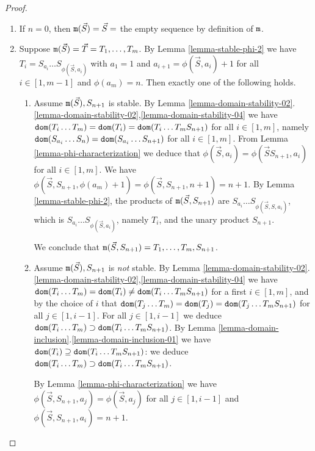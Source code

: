 \documentclass{lmcs}
\begin{document}
\begin{proof}
\begin{enumerate}
\item
If $n=0$, then ${\tt m}(\vec{S}) = \vec{S} = $ the empty sequence by definition
of ${\tt m}$.

\item
Suppose ${\tt m}(\vec{S}) = \vec{T} = T_1, \ldots, T_m$.  
By Lemma \ref{lemma-stable-phi-2}
we have $T_i = S_{a_i} \ldots S_{\phi(\vec{S},a_i)}$ with 
$a_1=1$ and $a_{i+1} = \phi(\vec{S},a_i)+1$ 
for all $i \in [1,m-1]$ and $\phi(a_{m}) = n$.  Then exactly one of the following holds.

\begin{enumerate}

\item
Assume ${\tt m}(\vec{S}), S_{n+1}$ is stable. By 
Lemma \ref{lemma-domain-stability-02}.
\ref{lemma-domain-stability-02},\ref{lemma-domain-stability-04} 
we have
${\tt dom}(T_i \ldots T_m) = {\tt dom}(T_i ) = {\tt dom}(T_i \ldots T_m S_{n+1})$ for all $i \in [1,m]$,
namely ${\tt dom}(S_{a_i} \ldots S_n) = {\tt dom}(S_{a_i} \ldots  S_{n+1})$ for all $i \in [1,m]$.
From Lemma \ref{lemma-phi-characterization} we deduce that $\phi(\vec{S},a_i) = 
\phi(\vec{S}S_{n+1},a_i)$ for all $i \in [1,m]$. We have 
$\phi(\vec{S},S_{n+1},\phi(a_{m}) +1)
= \phi(\vec{S},S_{n+1},n+1)=n+1$. By Lemma \ref{lemma-stable-phi-2}, the products of
${\tt m}(\vec{S},S_{n+1})$ are $S_{a_i} \ldots S_{\phi(\vec{S},S,a_i)}$, which is
$S_{a_i} \ldots S_{\phi(\vec{S},a_i)}$, namely $T_i$, and the unary product $S_{n+1}$.

We conclude that ${\tt m}(\vec{S}, S_{n+1}) = T_1, \ldots, T_m, S_{n+1}$.

\item
Assume ${\tt m}(\vec{S}), S_{n+1}$ is \emph{not} stable. By 
Lemma \ref{lemma-domain-stability-02}.
\ref{lemma-domain-stability-02},\ref{lemma-domain-stability-04} 
we have
${\tt dom}(T_i \ldots T_m) = {\tt dom}(T_i ) \not = {\tt dom}(T_i \ldots T_m S_{n+1})$ 
for a first $i \in [1,m]$, and by the choice of $i$ that 
${\tt dom}(T_j \ldots T_m) = {\tt dom}(T_j ) = {\tt dom}(T_j \ldots T_m S_{n+1})$ for all $j \in [1,i-1]$.
For all $j \in [1,i-1]$ we deduce ${\tt dom}(T_i \ldots T_m)\supset {\tt dom}(T_i \ldots T_m S_{n+1})$.
By Lemma \ref{lemma-domain-inclusion}.\ref{lemma-domain-inclusion-01}
we have ${\tt dom}(T_i ) \supseteq  {\tt dom}(T_i \ldots T_m S_{n+1})$:
we deduce ${\tt dom}(T_i \ldots T_m) \supset {\tt dom}(T_i \ldots T_m S_{n+1})$.

By Lemma \ref{lemma-phi-characterization} we have 
$\phi(\vec{S},S_{n+1},a_j) = \phi(\vec{S},a_j)$ for all $j \in [1,i-1]$ and 
$\phi(\vec{S},S_{n+1},a_i) = n+1$. 


\end{enumerate}
\end{enumerate}
\end{proof}
\end{document}
